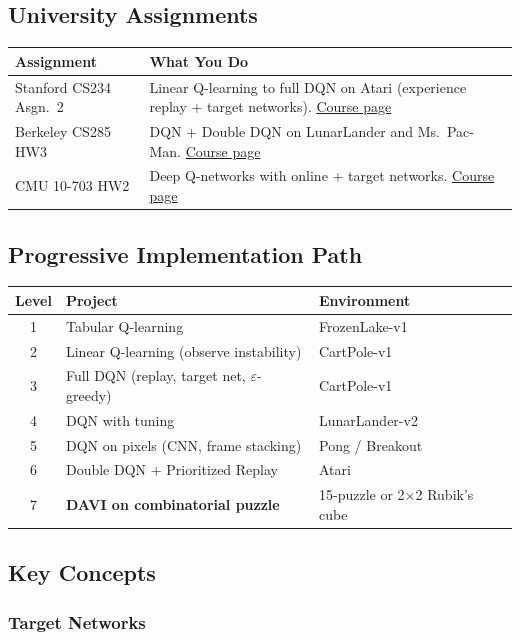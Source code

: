 \documentclass[11pt,letterpaper]{article}
\begin{document}
\subsection{University Assignments}

\begin{longtable}{@{}p{2.2in}p{3.6in}@{}}
\toprule
\textbf{Assignment} & \textbf{What You Do} \\
\midrule
\endhead
Stanford CS234 Asgn.\ 2 & Linear Q-learning to full DQN on Atari (experience replay + target networks). \href{https://web.stanford.edu/class/cs234/}{Course page} \\
\addlinespace
Berkeley CS285 HW3 & DQN + Double DQN on LunarLander and Ms.\ Pac-Man. \href{https://rail.eecs.berkeley.edu/deeprlcourse/}{Course page} \\
\addlinespace
CMU 10-703 HW2 & Deep Q-networks with online + target networks. \href{https://cmudeeprl.github.io/703website_f24/}{Course page} \\
\bottomrule
\end{longtable}

\subsection{Progressive Implementation Path}

\begin{longtable}{@{}clp{3.2in}@{}}
\toprule
\textbf{Level} & \textbf{Project} & \textbf{Environment} \\
\midrule
\endhead
1 & Tabular Q-learning & FrozenLake-v1 \\
2 & Linear Q-learning (observe instability) & CartPole-v1 \\
3 & Full DQN (replay, target net, $\varepsilon$-greedy) & CartPole-v1 \\
4 & DQN with tuning & LunarLander-v2 \\
5 & DQN on pixels (CNN, frame stacking) & Pong / Breakout \\
6 & Double DQN + Prioritized Replay & Atari \\
7 & \textbf{DAVI on combinatorial puzzle} & 15-puzzle or 2$\times$2 Rubik's cube \\
\bottomrule
\end{longtable}

\subsection{Key Concepts}

\subsubsection{Target Networks}
\end{document}
